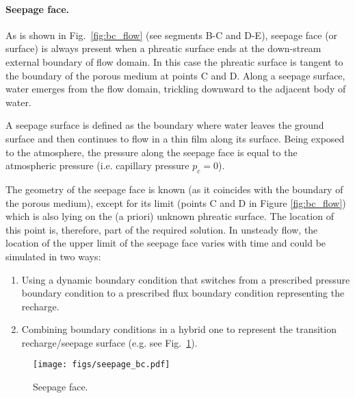 \paragraph{Seepage face.}
As is shown in Fig.~\ref{fig:bc_flow} (see segments B-C and D-E), seepage face (or surface) 
is always present when a phreatic surface ends at the down-stream external boundary of flow domain.
In this case the phreatic surface is tangent to the boundary of the porous medium at points C and D.
Along a seepage surface, water emerges from the flow domain, trickling downward to the adjacent body of water.

A seepage surface is defined as the boundary 
where water leaves the ground surface and then continues to flow in a thin film along its surface.
Being exposed to the atmosphere, the pressure along the seepage face is equal to the atmospheric pressure 
(i.e. capillary pressure $p_{c}=0$). 

The geometry of the seepage face is known (as it coincides with the boundary of the porous medium), 
except for its limit (points C and D in Figure \ref{fig:bc_flow}) 
which is also lying on the (a priori) unknown phreatic surface.
The location of this point is, therefore, part of the required solution.
In unsteady flow, the location of the upper limit of the seepage face varies with time
and could be simulated in two ways:
\begin{enumerate}
\item Using a dynamic boundary condition that switches from a prescribed pressure boundary condition
to a prescribed flux boundary condition representing the recharge.
\item Combining boundary conditions in a hybrid one to represent the transition recharge/seepage 
surface (e.g. see Fig.~\ref{fig:seepage_bc}).
\end{enumerate}

\begin{figure}  [h]
\begin{center}
\texttt{[image: figs/seepage\_bc.pdf]}
\caption{Seepage face.}
\label{fig:seepage_bc}
\end{center}
\end{figure}

